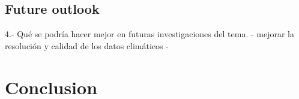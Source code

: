 \documentclass[
  number,
  preprint,
  3p,
  onecolumn]{elsarticle}
\begin{document}
\hypertarget{future-outlook}{%
\subsection{Future outlook}\label{future-outlook}}

4.- Qué se podría hacer mejor en futuras investigaciones del tema. -
mejorar la resolución y calidad de los datos climáticos -

\hypertarget{conclusion}{%
\section{Conclusion}\label{conclusion}}

\newpage


\renewcommand\refname{References}
  
\end{document}
